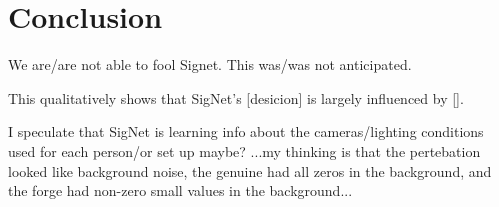 \section{Conclusion}\label{sec:conclusion}

We are/are not able to fool Signet.
This was/was not anticipated.

This qualitatively shows that SigNet's [desicion] is largely influenced by [].


I speculate that SigNet is learning info about the cameras/lighting conditions used for each person/or set up maybe?
...my thinking is that the pertebation looked like background noise, the genuine had all zeros in the background, and the forge had non-zero small values in the background...
